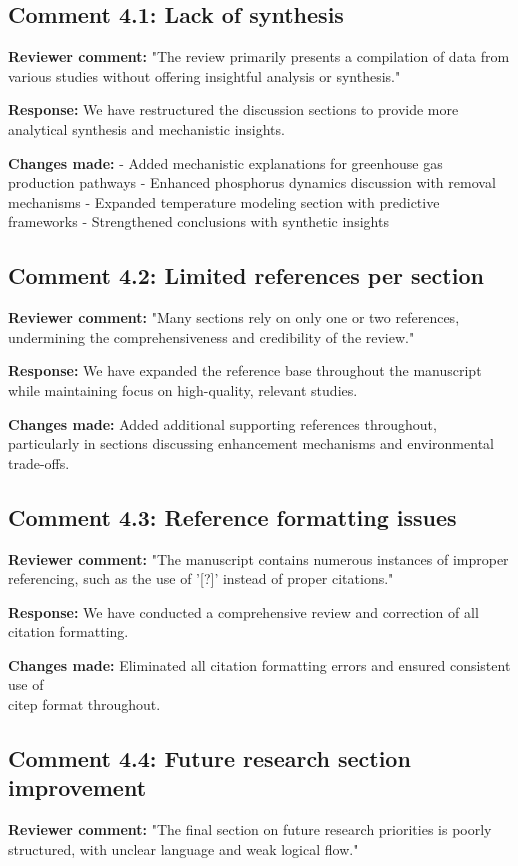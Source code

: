 \documentclass[12pt,a4paper]{article}
\begin{document}
\subsection{Comment 4.1: Lack of synthesis}
\textbf{Reviewer comment:} "The review primarily presents a compilation of data from various studies without offering insightful analysis or synthesis."

\textbf{Response:} We have restructured the discussion sections to provide more analytical synthesis and mechanistic insights.

\textbf{Changes made:} 
- Added mechanistic explanations for greenhouse gas production pathways
- Enhanced phosphorus dynamics discussion with removal mechanisms
- Expanded temperature modeling section with predictive frameworks
- Strengthened conclusions with synthetic insights

\subsection{Comment 4.2: Limited references per section}
\textbf{Reviewer comment:} "Many sections rely on only one or two references, undermining the comprehensiveness and credibility of the review."

\textbf{Response:} We have expanded the reference base throughout the manuscript while maintaining focus on high-quality, relevant studies.

\textbf{Changes made:} Added additional supporting references throughout, particularly in sections discussing enhancement mechanisms and environmental trade-offs.

\subsection{Comment 4.3: Reference formatting issues}
\textbf{Reviewer comment:} "The manuscript contains numerous instances of improper referencing, such as the use of '[?]' instead of proper citations."

\textbf{Response:} We have conducted a comprehensive review and correction of all citation formatting.

\textbf{Changes made:} Eliminated all citation formatting errors and ensured consistent use of \\citep{} format throughout.

\subsection{Comment 4.4: Future research section improvement}
\textbf{Reviewer comment:} "The final section on future research priorities is poorly structured, with unclear language and weak logical flow."
\end{document}
